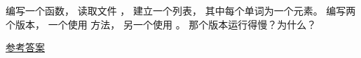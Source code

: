 \begin{exercise}
  
  


编写一个函数， 读取文件 {\em {}}， 建立一个列表， 其中每个单词为一个元素。
编写两个版本， 一个使用 {\em {}} 方法， 另一个使用 {\em {}}。
那个版本运行得慢？为什么？


\href{http://thinkpython2.com/code/wordlist.py}{参考答案}

  

\end{exercise}



